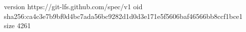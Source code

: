 version https://git-lfs.github.com/spec/v1
oid sha256:ca4c3e7b9bf0d4bc7ada56bc9282d1d0d3e171e5f5606baf46566bb8ccf1bce1
size 4261
